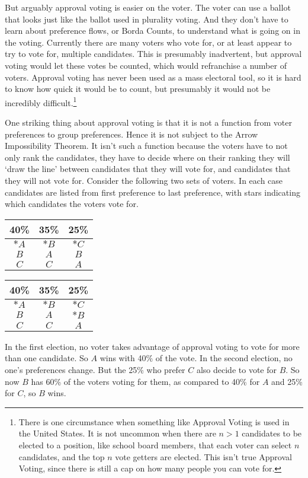 \documentclass[11pt,]{article}
\let\rmarkdownfootnote\footnote%
\def\footnote{\protect\rmarkdownfootnote}
\begin{document}
But arguably approval voting is easier on the voter. The voter can use a
ballot that looks just like the ballot used in plurality voting. And
they don't have to learn about preference flows, or Borda Counts, to
understand what is going on in the voting. Currently there are many
voters who vote for, or at least appear to try to vote for, multiple
candidates. This is presumably inadvertent, but approval voting would
let these votes be counted, which would refranchise a number of voters.
Approval voting has never been used as a mass electoral tool, so it is
hard to know how quick it would be to count, but presumably it would not
be incredibly difficult.\footnote{There is one circumstance when
  something like Approval Voting is used in the United States. It is not
  uncommon when there are \(n > 1\) candidates to be elected to a
  position, like school board members, that each voter can select \(n\)
  candidates, and the top \(n\) vote getters are elected. This isn't
  true Approval Voting, since there is still a cap on how many people
  you can vote for.}

One striking thing about approval voting is that it is not a function
from voter preferences to group preferences. Hence it is not subject to
the Arrow Impossibility Theorem. It isn't such a function because the
voters have to not only rank the candidates, they have to decide where
on their ranking they will `draw the line' between candidates that they
will vote for, and candidates that they will not vote for. Consider the
following two sets of voters. In each case candidates are listed from
first preference to last preference, with stars indicating which
candidates the voters vote for.

\begin{longtable}[]{@{}ccc@{}}
\toprule
40\% & 35\% & 25\%\tabularnewline
\midrule
\endhead
\(*A\) & \(*B\) & \(*C\)\tabularnewline
\(B\) & \(A\) & \(B\)\tabularnewline
\(C\) & \(C\) & \(A\)\tabularnewline
\bottomrule
\end{longtable}

\begin{longtable}[]{@{}ccc@{}}
\toprule
40\% & 35\% & 25\%\tabularnewline
\midrule
\endhead
\(*A\) & \(*B\) & \(*C\)\tabularnewline
\(B\) & \(A\) & \(*B\)\tabularnewline
\(C\) & \(C\) & \(A\)\tabularnewline
\bottomrule
\end{longtable}

In the first election, no voter takes advantage of approval voting to
vote for more than one candidate. So \(A\) wins with 40\% of the vote.
In the second election, no one's preferences change. But the 25\% who
prefer \(C\) also decide to vote for \(B\). So now \(B\) has 60\% of the
voters voting for them, as compared to 40\% for \(A\) and 25\% for
\(C\), so \(B\) wins.
\end{document}
